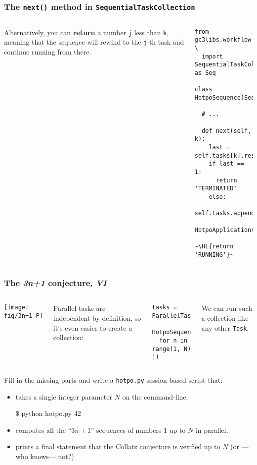 \documentclass[english,serif,mathserif,xcolor=pdftex,dvipsnames,table]{beamer}
\begin{document}
\begin{frame}[fragile]
  \frametitle{The \texttt{next()} method in \texttt{SequentialTaskCollection}}
  \label{sec:14}

  \begin{columns}
    Alternatively, you can \textbf{return} a number \texttt{j} less than \texttt{k},
    meaning that the sequence will rewind to the \texttt{j}-th task and continue
    running from there.

    \begin{lstlisting}[basicstyle=\ttfamily\footnotesize]
from gc3libs.workflow \
  import SequentialTaskCollection as Seq

class HotpoSequence(Seq):

  # ...

  def next(self, k):
    last = self.tasks[k].result
    if last == 1:
      return 'TERMINATED'
    else:
      self.tasks.append(
        HotpoApplication(last))
      ~\HL{return 'RUNNING'}~
    \end{lstlisting}
  \end{columns}
\end{frame}


\begin{frame}[fragile]
  \frametitle{The \emph{3n+1} conjecture, \emph{VI}}
  \label{sec:15}

  \begin{columns}
    \begin{center}
      \texttt{[image: fig/3n+1\_P]}
    \end{center}

    \small
    Parallel tasks are independent by definition, so it's even easier to
    create a collection:
    \begin{lstlisting}
tasks = ParallelTaskCollection([
  HotpoSequence(n)
  for n in range(1, N) 
])
    \end{lstlisting}

    We can run such a collection like any other \texttt{Task}.
  \end{columns}
\end{frame}


\begin{frame}[fragile]
  \begin{exercise*}[11.A]

    \+
    Fill in the missing parts and write a \texttt{hotpo.py} session-based script that:
    \begin{itemize}
    \item takes a single integer parameter $N$ on the command-line:
      \begin{semiverbatim}
\$ python hotpo.py 42        
      \end{semiverbatim}
    \item computes all the ``$3n+1$'' sequences of numbers $1$ up to $N$ in parallel,
    \item prints a final statement that the Collatz conjecture is verified up to $N$ (or ---who knows--- not?)
    \end{itemize}
  \end{exercise*}
\end{frame}
\end{document}
